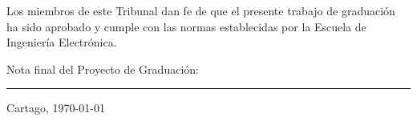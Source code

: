 \vfill

Los miembros de este Tribunal dan fe de que el presente trabajo de graduación
ha sido aprobado y cumple con las normas establecidas por la Escuela de
Ingeniería Electrónica.

\vfill

\begin{center}
  Nota final del Proyecto de Graduación: \rule{3cm}{0.5pt}
\end{center}
\vfill

\begin{center}
  Cartago, \today \par
\end{center}

\cleardoublepage

